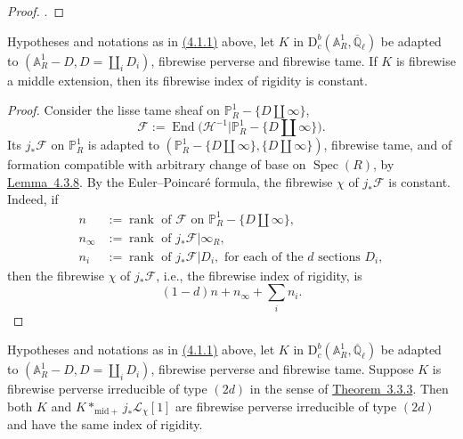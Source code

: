 \begin{proof}
\cite[4.7.2 and 4.7.3]{Ka-SE}.
\end{proof}

Hypotheses and notations as in \hyperref[par:4.1.1]{(4.1.1)} above, let \(K\)
in \(\mathrm{D}^b_c(\mathbb{A}^1_R,\overline{\mathbb{Q}}_\ell)\) be adapted to
\((\mathbb{A}^1_R-D,D=\coprod_iD_i)\), fibrewise perverse and fibrewise tame.
If \(K\) is fibrewise a middle extension, then its fibrewise index of rigidity
is constant.

\begin{proof}
Consider the lisse tame sheaf on \(\mathbb{P}^1_R-\{D\coprod\infty\}\),
\[
  \mathcal{F}:=\operatorname{End}\bigl(
  \mathcal{H}^{-1}\vert\mathbb{P}^1_R-\{D\coprod\infty\}\bigr).
\]
Its \(j_*\mathcal{F}\) on \(\mathbb{P}^1_R\) is adapted to
\((\mathbb{P}^1_R-\{D\coprod\infty\},\{D\coprod\infty\})\), fibrewise tame, and
of formation compatible with arbitrary change of base on \(\operatorname{Spec}(R)\),
by \hyperref[lem:4.3.8]{Lemma~4.3.8}. By the Euler--Poincaré formula, the fibrewise
\(\chi\) of \(j_*\mathcal{F}\) is constant. Indeed, if
\[
\begin{aligned}
  n&:=\operatorname{rank}\text{ of }\mathcal{F}
  \text{ on }\mathbb{P}^1_R-\{D\coprod\infty\},\\
  n_\infty&:=\operatorname{rank}\text{ of }j_*\mathcal{F}\vert\infty_R,\\
  n_i&:=\operatorname{rank}\text{ of }j_*\mathcal{F}\vert D_i,
  \text{ for each of the }d\text{ sections }D_i,
\end{aligned}
\]
then the fibrewise \(\chi\) of \(j_*\mathcal{F}\), i.e., the fibrewise index of
rigidity, is
\[
  (1-d)n+n_\infty+\sum_i n_i.
\]
\end{proof}

Hypotheses and notations as in \hyperref[par:4.1.1]{(4.1.1)} above, let \(K\)
in \(\mathrm{D}^b_c(\mathbb{A}^1_R,\overline{\mathbb{Q}}_\ell)\) be adapted to
\((\mathbb{A}^1_R-D,D=\coprod_iD_i)\), fibrewise perverse and fibrewise tame.
Suppose \(K\) is fibrewise perverse irreducible of type \((2d)\) in the sense
of \hyperref[thm:3.3.3]{Theorem~3.3.3}. Then both \(K\) and
\(K*_{\mathrm{mid}+}j_*\mathcal{L}_\chi[1]\) are fibrewise perverse
irreducible of type \((2d)\) and have the same index of rigidity.

